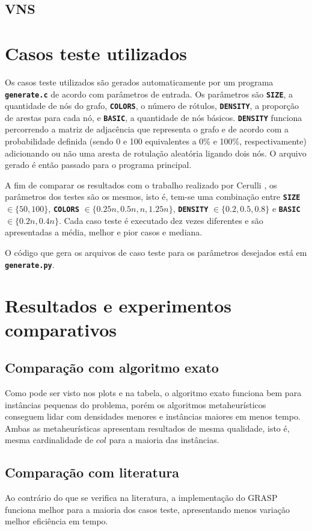 \documentclass[12pt, a4paper]{article}
\newcommand{\ic}[1]{\textbf{\lstinline{#1}}}
\begin{document}
\subsection{VNS}

\section{Casos teste utilizados}
Os casos teste utilizados são gerados automaticamente por um programa
\ic{generate.c} de acordo com parâmetros de entrada. Os parâmetros são
\ic{SIZE}, a quantidade de nós do grafo, \ic{COLORS}, o número de rótulos,
\ic{DENSITY}, a proporção de arestas para cada nó, e \ic{BASIC}, a quantidade
de nós básicos. \ic{DENSITY} funciona percorrendo a matriz de adjacência que
representa o grafo e de acordo com a probabilidade definida (sendo 0 e 100
equivalentes a 0\% e 100\%, respectivamente) adicionando ou não uma aresta de
rotulação aleatória ligando dois nós. O arquivo gerado é então passado para o
programa principal.

A fim de comparar os resultados com o trabalho realizado por Cerulli
\cite{cerulli}, os parâmetros dos testes são os mesmos, isto é, tem-se uma
combinação entre \ic{SIZE} $ \in \{50, 100\} $, \ic{COLORS} $ \in \{0.25n,
0.5n, n, 1.25n\} $, \ic{DENSITY} $ \in \{0.2, 0.5, 0.8\}$ e \ic{BASIC} $ \in
\{0.2n, 0.4n\} $. Cada caso teste é executado dez vezes diferentes e são
apresentadas a média, melhor e pior casos e mediana.

O código que gera os arquivos de caso teste para os parâmetros desejados está
em \ic{generate.py}.

\section{Resultados e experimentos comparativos}
\subsection{Comparação com algoritmo exato}
Como pode ser visto nos plots e na tabela, o algoritmo exato funciona bem para
instâncias pequenas do problema, porém os algoritmos metaheurísticos conseguem
lidar com densidades menores e instâncias maiores em menos tempo. Ambas as
metaheurísticas apresentam resultados de mesma qualidade, isto é, mesma
cardinalidade de $ col $ para a maioria das instâncias.

\subsection{Comparação com literatura}
Ao contrário do que se verifica na literatura, a implementação do GRASP
funciona melhor para a maioria dos casos teste, apresentando menos variação
melhor eficiência em tempo.
\end{document}
